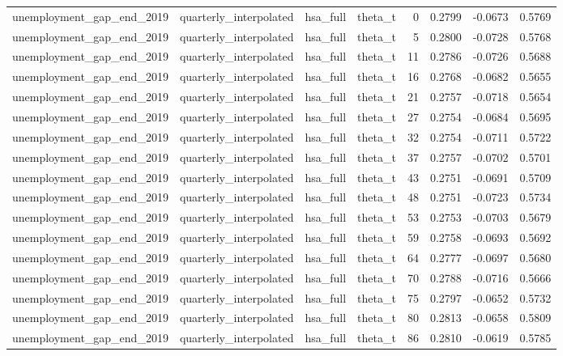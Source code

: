 \begin{tabular}{llllrrrr}
unemployment\_gap\_end\_2019 & quarterly\_interpolated & hsa\_full & theta\_t & 0 & 0.2799 & -0.0673 & 0.5769 \\
unemployment\_gap\_end\_2019 & quarterly\_interpolated & hsa\_full & theta\_t & 5 & 0.2800 & -0.0728 & 0.5768 \\
unemployment\_gap\_end\_2019 & quarterly\_interpolated & hsa\_full & theta\_t & 11 & 0.2786 & -0.0726 & 0.5688 \\
unemployment\_gap\_end\_2019 & quarterly\_interpolated & hsa\_full & theta\_t & 16 & 0.2768 & -0.0682 & 0.5655 \\
unemployment\_gap\_end\_2019 & quarterly\_interpolated & hsa\_full & theta\_t & 21 & 0.2757 & -0.0718 & 0.5654 \\
unemployment\_gap\_end\_2019 & quarterly\_interpolated & hsa\_full & theta\_t & 27 & 0.2754 & -0.0684 & 0.5695 \\
unemployment\_gap\_end\_2019 & quarterly\_interpolated & hsa\_full & theta\_t & 32 & 0.2754 & -0.0711 & 0.5722 \\
unemployment\_gap\_end\_2019 & quarterly\_interpolated & hsa\_full & theta\_t & 37 & 0.2757 & -0.0702 & 0.5701 \\
unemployment\_gap\_end\_2019 & quarterly\_interpolated & hsa\_full & theta\_t & 43 & 0.2751 & -0.0691 & 0.5709 \\
unemployment\_gap\_end\_2019 & quarterly\_interpolated & hsa\_full & theta\_t & 48 & 0.2751 & -0.0723 & 0.5734 \\
unemployment\_gap\_end\_2019 & quarterly\_interpolated & hsa\_full & theta\_t & 53 & 0.2753 & -0.0703 & 0.5679 \\
unemployment\_gap\_end\_2019 & quarterly\_interpolated & hsa\_full & theta\_t & 59 & 0.2758 & -0.0693 & 0.5692 \\
unemployment\_gap\_end\_2019 & quarterly\_interpolated & hsa\_full & theta\_t & 64 & 0.2777 & -0.0697 & 0.5680 \\
unemployment\_gap\_end\_2019 & quarterly\_interpolated & hsa\_full & theta\_t & 70 & 0.2788 & -0.0716 & 0.5666 \\
unemployment\_gap\_end\_2019 & quarterly\_interpolated & hsa\_full & theta\_t & 75 & 0.2797 & -0.0652 & 0.5732 \\
unemployment\_gap\_end\_2019 & quarterly\_interpolated & hsa\_full & theta\_t & 80 & 0.2813 & -0.0658 & 0.5809 \\
unemployment\_gap\_end\_2019 & quarterly\_interpolated & hsa\_full & theta\_t & 86 & 0.2810 & -0.0619 & 0.5785 \\

\end{tabular}
